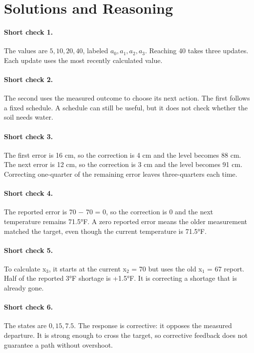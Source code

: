 \documentclass[11pt,letterpaper]{article}
\begin{document}
\clearpage
{\setlength{\parskip}{4pt}
\section*{Solutions and Reasoning}

\paragraph{Short check 1.}
The values are \(5,10,20,40\), labeled \(a_0,a_1,a_2,a_3\). Reaching 40 takes three updates. Each update uses the most recently calculated value.


\paragraph{Short check 2.}
The second uses the measured outcome to choose its next action. The first follows a fixed schedule. A schedule can still be useful, but it does not check whether the soil needs water.


\paragraph{Short check 3.}
The first error is 16 cm, so the correction is 4 cm and the level becomes 88 cm. The next error is 12 cm, so the correction is 3 cm and the level becomes 91 cm. Correcting one-quarter of the remaining error leaves three-quarters each time.


\paragraph{Short check 4.}
The reported error is 70 $-$ 70 = 0, so the correction is 0 and the next temperature remains 71.5°F. A zero reported error means the older measurement matched the target, even though the current temperature is 71.5°F.


\paragraph{Short check 5.}
To calculate x$_3$, it starts at the current x$_2$ = 70 but uses the old x$_1$ = 67 report. Half of the reported 3°F shortage is +1.5°F. It is correcting a shortage that is already gone.


\paragraph{Short check 6.}
The states are \(0,15,7.5\). The response is corrective: it opposes the measured departure. It is strong enough to cross the target, so corrective feedback does not guarantee a path without overshoot.


}
\end{document}
